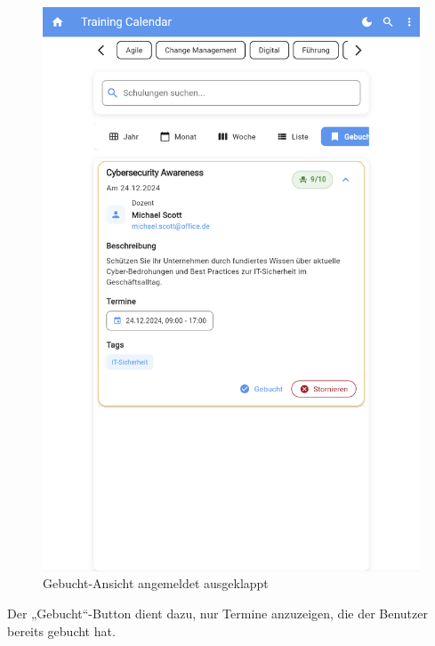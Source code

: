 \begin{itemize}
\begin{figure}[htbp!]
        \includegraphics[scale=0.2]{img/flutter_21.png}
        \caption{Gebucht-Ansicht angemeldet ausgeklappt}
        \label{Gebucht3}
    \end{figure}
Der „Gebucht“-Button dient dazu, nur Termine anzuzeigen, die der Benutzer bereits gebucht hat.


\end{itemize}
